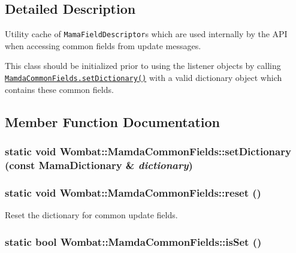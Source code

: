 \subsection{Detailed Description}
Utility cache of {\tt Mama\-Field\-Descriptor}s which are used internally by the API when accessing common fields from update messages. 

This class should be initialized prior to using the listener objects by calling {\tt \hyperlink{classWombat_1_1MamdaCommonFields_116796372a323981128e37e1280d1687}{Mamda\-Common\-Fields.set\-Dictionary()}} with a valid dictionary object which contains these common fields. 



\subsection{Member Function Documentation}
\hypertarget{classWombat_1_1MamdaCommonFields_116796372a323981128e37e1280d1687}{
\subsubsection[setDictionary]{\setlength{\rightskip}{0pt plus 5cm}static void Wombat::Mamda\-Common\-Fields::set\-Dictionary (const Mama\-Dictionary \& {\em dictionary})}}
\label{classWombat_1_1MamdaCommonFields_116796372a323981128e37e1280d1687}


\hypertarget{classWombat_1_1MamdaCommonFields_264321093ccccc6f9ed3277aedc28786}{
\subsubsection[reset]{\setlength{\rightskip}{0pt plus 5cm}static void Wombat::Mamda\-Common\-Fields::reset ()}}
\label{classWombat_1_1MamdaCommonFields_264321093ccccc6f9ed3277aedc28786}


Reset the dictionary for common update fields. 

\hypertarget{classWombat_1_1MamdaCommonFields_5b249556636a799085934d95baf141ee}{
\subsubsection[isSet]{\setlength{\rightskip}{0pt plus 5cm}static bool Wombat::Mamda\-Common\-Fields::is\-Set ()}}
\label{classWombat_1_1MamdaCommonFields_5b249556636a799085934d95baf141ee}




